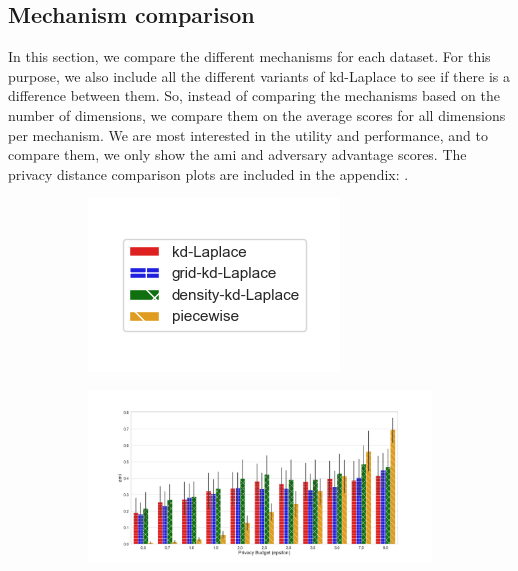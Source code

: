 \subsection{Mechanism comparison}
In this section, we compare the different mechanisms for each dataset.
For this purpose, we also include all the different variants of kd-Laplace to see if there is a difference between them.
So, instead of comparing the mechanisms based on the number of dimensions, we compare them on the average scores for all dimensions per mechanism.
We are most interested in the utility and performance, and to compare them, we only show the \gls{ami} and adversary advantage scores.
The privacy distance comparison plots are included in the appendix: .
\begin{figure}[H]
    \centering
    \begin{subfigure}{0.30\textwidth}
        \includegraphics[width=\textwidth]{Results/kd-laplace/ami_bar_comparison_legend.png}
    \end{subfigure}
    \begin{subfigure}{1\textwidth}
        \includegraphics[width=1\textwidth]{Results/kd-laplace/ami_seeds-dataset_comparison.png}

\end{subfigure}
\end{figure}
